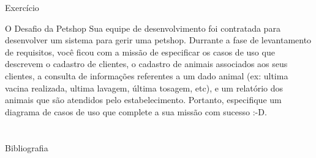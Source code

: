 \documentclass[xcolor=x11names,compress]{beamer}
\begin{document}
\begin{frame}{Exercício}

\begin{alertblock}{O Desafio da Petshop}
Sua equipe de desenvolvimento foi contratada para desenvolver um sistema para gerir uma petshop. Durrante a fase de levantamento de requisitos, você ficou com a missão de especificar os casos de uso que descrevem o cadastro de clientes, o cadastro de animais associados aos seus clientes, a consulta de informações referentes a um dado animal (ex: ultima vacina realizada, ultima lavagem, última tosagem, etc), e um relatório dos animais que são atendidos pelo estabelecimento. Portanto, especifique um diagrama de casos de uso que complete a sua missão com sucesso :-D. 
\end{alertblock}

\end{frame}

\section{}

\begin{frame}{Bibliografia}

\begin{thebibliography}{Pressman, 2001}









\end{thebibliography}

\end{frame}
\end{document}
